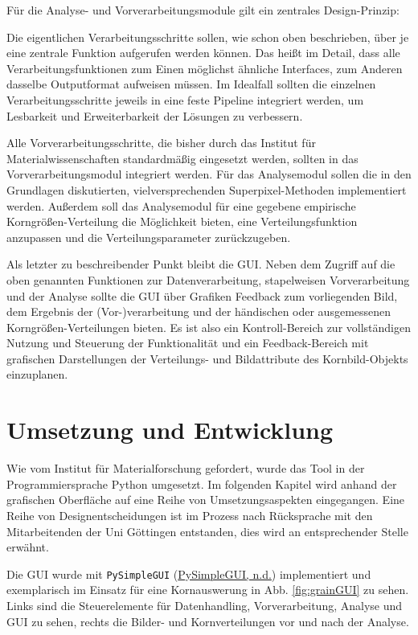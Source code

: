 \documentclass[
  12pt,
]{book}
\begin{document}
Für die Analyse- und Vorverarbeitungsmodule gilt ein zentrales Design-Prinzip:

Die eigentlichen Verarbeitungsschritte sollen, wie schon oben beschrieben, über je eine zentrale Funktion aufgerufen werden können. Das heißt im Detail, dass alle Verarbeitungsfunktionen zum Einen möglichst ähnliche Interfaces, zum Anderen dasselbe Outputformat aufweisen müssen. Im Idealfall sollten die einzelnen Verarbeitungsschritte jeweils in eine feste Pipeline integriert werden, um Lesbarkeit und Erweiterbarkeit der Lösungen zu verbessern.

Alle Vorverarbeitungsschritte, die bisher durch das Institut für Materialwissenschaften standardmäßig eingesetzt werden, sollten in das Vorverarbeitungsmodul integriert werden. Für das Analysemodul sollen die in den Grundlagen diskutierten, vielversprechenden Superpixel-Methoden implementiert werden. Außerdem soll das Analysemodul für eine gegebene empirische Korngrößen-Verteilung die Möglichkeit bieten, eine Verteilungsfunktion anzupassen und die Verteilungsparameter zurückzugeben.

Als letzter zu beschreibender Punkt bleibt die GUI. Neben dem Zugriff auf die oben genannten Funktionen zur Datenverarbeitung, stapelweisen Vorverarbeitung und der Analyse sollte die GUI über Grafiken Feedback zum vorliegenden Bild, dem Ergebnis der (Vor-)verarbeitung und der händischen oder ausgemessenen Korngrößen-Verteilungen bieten. Es ist also ein Kontroll-Bereich zur vollständigen Nutzung und Steuerung der Funktionalität und ein Feedback-Bereich mit grafischen Darstellungen der Verteilungs- und Bildattribute des Kornbild-Objekts einzuplanen.

\hypertarget{umsetzung-und-entwicklung}{%
\chapter{Umsetzung und Entwicklung}\label{umsetzung-und-entwicklung}}

Wie vom Institut für Materialforschung gefordert, wurde das Tool in der Programmiersprache Python umgesetzt.
Im folgenden Kapitel wird anhand der grafischen Oberfläche auf eine Reihe von Umsetzungsaspekten eingegangen. Eine Reihe von Designentscheidungen ist im Prozess nach Rücksprache mit den Mitarbeitenden der Uni Göttingen entstanden, dies wird an entsprechender Stelle erwähnt.

Die GUI wurde mit \texttt{PySimpleGUI} (\protect\hyperlink{ref-pysimpleguiPySimpleGUIPythonGUIs}{PySimpleGUI, n.d.}) implementiert und exemplarisch im Einsatz für eine Kornauswerung in Abb. \ref{fig:grainGUI} zu sehen. Links sind die Steuerelemente für Datenhandling, Vorverarbeitung, Analyse und GUI zu sehen, rechts die Bilder- und Kornverteilungen vor und nach der Analyse.
\end{document}
